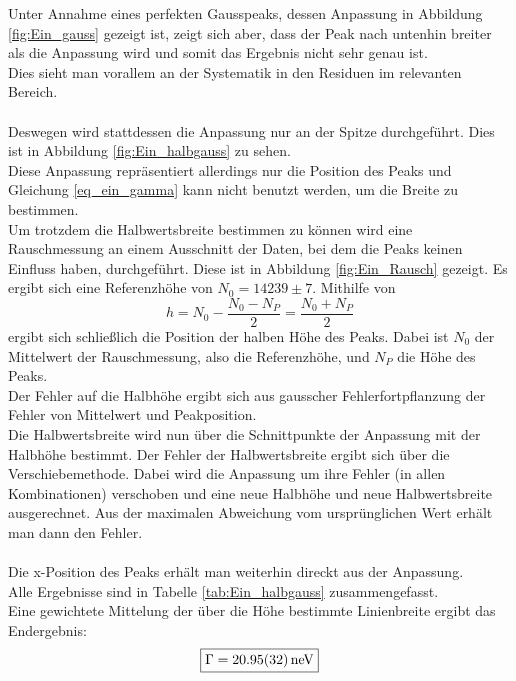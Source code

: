 \documentclass[12pt,a4paper]{article}
\begin{document}
Unter Annahme eines perfekten Gausspeaks, dessen Anpassung in Abbildung \ref{fig:Ein_gauss} gezeigt ist, zeigt sich aber, dass der Peak nach untenhin breiter als die Anpassung wird und somit das Ergebnis nicht sehr genau ist.\\
Dies sieht man vorallem an der Systematik in den Residuen im relevanten Bereich.\\
\\
Deswegen wird stattdessen die Anpassung nur an der Spitze durchgeführt. Dies ist in Abbildung \ref{fig:Ein_halbgauss} zu sehen.\\
Diese Anpassung repräsentiert allerdings nur die Position des Peaks und Gleichung \ref{eq_ein_gamma} kann nicht benutzt werden, um die Breite zu bestimmen.\\
Um trotzdem die Halbwertsbreite bestimmen zu können wird eine Rauschmessung an einem Ausschnitt der Daten, bei dem die Peaks keinen Einfluss haben, durchgeführt. Diese ist in Abbildung \ref{fig:Ein_Rausch} gezeigt. Es ergibt sich eine Referenzhöhe von $N_0 = 14239\pm 7$.
Mithilfe von 
\begin{equation}
h = N_0 - \dfrac{N_0-N_P}{2} = \dfrac{N_0+N_P}{2}
\end{equation}
ergibt sich schließlich die Position der halben Höhe des Peaks. Dabei ist $N_0$ der Mittelwert der Rauschmessung, also die Referenzhöhe, und $N_P$ die Höhe des Peaks.\\
Der Fehler auf die Halbhöhe ergibt sich aus gausscher Fehlerfortpflanzung der Fehler von Mittelwert und Peakposition.\\
Die Halbwertsbreite wird nun über die Schnittpunkte der Anpassung mit der Halbhöhe bestimmt. Der Fehler der Halbwertsbreite ergibt sich über die Verschiebemethode. Dabei wird die Anpassung um ihre Fehler (in allen Kombinationen) verschoben und eine neue Halbhöhe und neue Halbwertsbreite ausgerechnet. Aus der maximalen Abweichung vom ursprünglichen Wert erhält man dann den Fehler.\\
\\
Die x-Position des Peaks erhält man weiterhin direckt aus der Anpassung.\\
Alle Ergebnisse sind in Tabelle \ref{tab:Ein_halbgauss} zusammengefasst.\\
Eine gewichtete Mittelung der über die Höhe bestimmte Linienbreite ergibt das Endergebnis:
\begin{equation*}
\boxed{\Gamma = \SI{20.95\pm 0.32}{neV}}
\end{equation*}
\end{document}

